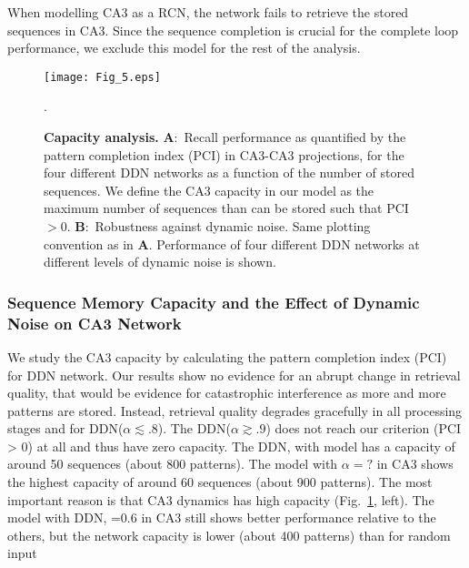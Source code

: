 \documentclass[utf8]{frontiersSCNS} %
\begin{document}
When modelling CA3 as a RCN, the network fails to retrieve the stored sequences in CA3. Since the sequence completion is crucial for the complete loop performance, we exclude this model for the rest of the analysis.


\begin{figure}[!htb]
\centering\texttt{[image: Fig\_5.eps]}
\caption{\textbf{Capacity analysis.} 
\textbf{A}:~Recall performance as quantified by the pattern completion index (PCI) in CA3-CA3 projections, for the four different DDN networks as a function of the number of stored sequences. 
We define the CA3 capacity in our model as the maximum number of sequences than can be stored such that PCI $> 0$. \textbf{B}:~Robustness against dynamic noise.
Same plotting convention as in \textbf{A}.
Performance of four different DDN networks at different levels of dynamic noise is shown.
}.   
\label{Fig_5}
\end{figure}

\subsubsection{Sequence Memory Capacity and the Effect of Dynamic Noise on CA3 Network}

We study the CA3 capacity by calculating the pattern completion index (PCI) for DDN network. Our results show no evidence for an abrupt change in retrieval quality, that would be evidence for catastrophic interference as more and more patterns are stored. Instead, retrieval quality degrades gracefully in all processing stages and for DDN($\alpha \lesssim .8$).
The DDN($\alpha \gtrsim .9$) does not reach our criterion (PCI > 0) at all and thus have zero capacity. The DDN, with model has a capacity of around 50 sequences (about 800 patterns). The model with $\alpha = ?$ in CA3 shows the highest capacity of around 60 sequences (about 900 patterns). The most important reason is that CA3 dynamics has high capacity (Fig.~\ref{Fig_5}, left).  
The model with DDN, =0.6 in CA3 still shows better performance relative to the others, but the network capacity is lower (about 400 patterns) than for random input
\end{document}
